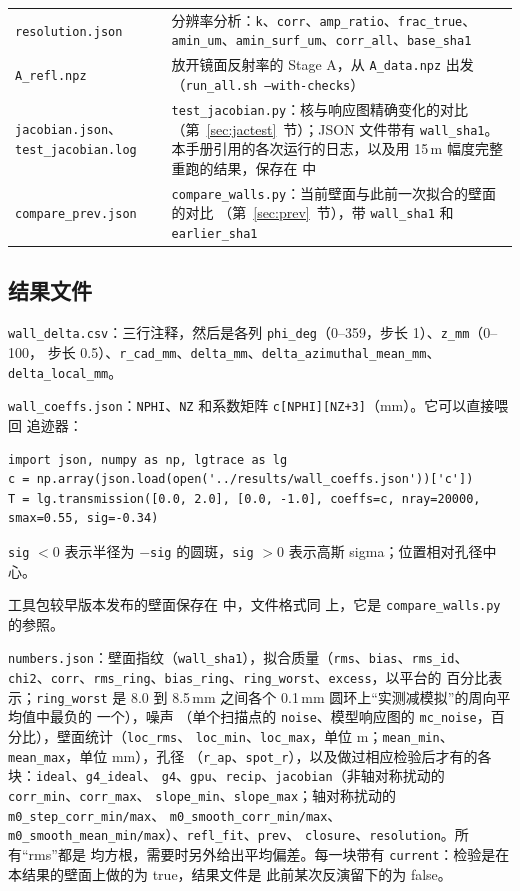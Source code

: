 \documentclass[11pt,a4paper,fontset=fandol]{ctexart}
\newcommand{\um}{\,\textmu m}
\newcommand{\code}[1]{\texttt{#1}}
\begin{document}
\begin{tabularx}{\textwidth}{@{}L{3.5cm}Y@{}}
\code{resolution.json} & 分辨率分析：\code{k}、\code{corr}、\code{amp\_ratio}、\code{frac\_true}、
\code{amin\_um}、\code{amin\_surf\_um}、\code{corr\_all}、\code{base\_sha1} \\
\code{A\_refl.npz} & 放开镜面反射率的 Stage A，从 \code{A\_data.npz} 出发（\code{run\_all.sh --with-checks}） \\
\code{jacobian.json}、\code{test\_jacobian.log} & \code{test\_jacobian.py}：核与响应图精确变化的对比
（第~\ref{sec:jactest}~节）；JSON 文件带有 \code{wall\_sha1}。本手册引用的各次运行的日志，以及用
15\um{} 幅度完整重跑的结果，保存在  中 \\
\code{compare\_prev.json} & \code{compare\_walls.py}：当前壁面与此前一次拟合的壁面的对比
（第~\ref{sec:prev}~节），带 \code{wall\_sha1} 和 \code{earlier\_sha1} \\
\bottomrule
\end{tabularx}

\subsection{结果文件}

\code{wall\_delta.csv}：三行注释，然后是各列 \code{phi\_deg}（0--359，步长 1）、\code{z\_mm}（0--100，
步长 0.5）、\code{r\_cad\_mm}、\code{delta\_mm}、\code{delta\_azimuthal\_mean\_mm}、
\code{delta\_local\_mm}。

\code{wall\_coeffs.json}：\code{NPHI}、\code{NZ} 和系数矩阵 \code{c[NPHI][NZ+3]}（mm）。它可以直接喂回
追迹器：
\begin{lstlisting}
import json, numpy as np, lgtrace as lg
c = np.array(json.load(open('../results/wall_coeffs.json'))['c'])
T = lg.transmission([0.0, 2.0], [0.0, -1.0], coeffs=c, nray=20000, smax=0.55, sig=-0.34)
\end{lstlisting}
\code{sig} $<0$ 表示半径为 $-$\code{sig} 的圆斑，\code{sig} $>0$ 表示高斯 sigma；位置相对孔径中心。

工具包较早版本发布的壁面保存在  中，文件格式同
上，它是 \code{compare\_walls.py} 的参照。

\code{numbers.json}：壁面指纹（\code{wall\_sha1}），拟合质量（\code{rms}、\code{bias}、\code{rms\_id}、
\code{chi2}、\code{corr}、\code{rms\_ring}、\code{bias\_ring}、\code{ring\_worst}、\code{excess}，以平台的
百分比表示；\code{ring\_worst} 是 8.0 到 8.5\,mm 之间各个 0.1\,mm 圆环上“实测减模拟”的周向平均值中最负的
一个），噪声
（单个扫描点的 \code{noise}、模型响应图的 \code{mc\_noise}，百分比），壁面统计（\code{loc\_rms}、
\code{loc\_min}、\code{loc\_max}，单位 \textmu m；\code{mean\_min}、\code{mean\_max}，单位 mm），孔径
（\code{r\_ap}、\code{spot\_r}），以及做过相应检验后才有的各块：\code{ideal}、\code{g4\_ideal}、
\code{g4}、\code{gpu}、\code{recip}、\code{jacobian}（非轴对称扰动的 \code{corr\_min}、\code{corr\_max}、
\code{slope\_min}、\code{slope\_max}；轴对称扰动的 \code{m0\_step\_corr\_min/max}、
\code{m0\_smooth\_corr\_min/max}、\code{m0\_smooth\_mean\_min/max}）、\code{refl\_fit}、\code{prev}、
\code{closure}、\code{resolution}。所有“rms”都是
均方根，需要时另外给出平均偏差。每一块带有 \code{current}：检验是在本结果的壁面上做的为 true，结果文件是
此前某次反演留下的为 false。
\end{document}
